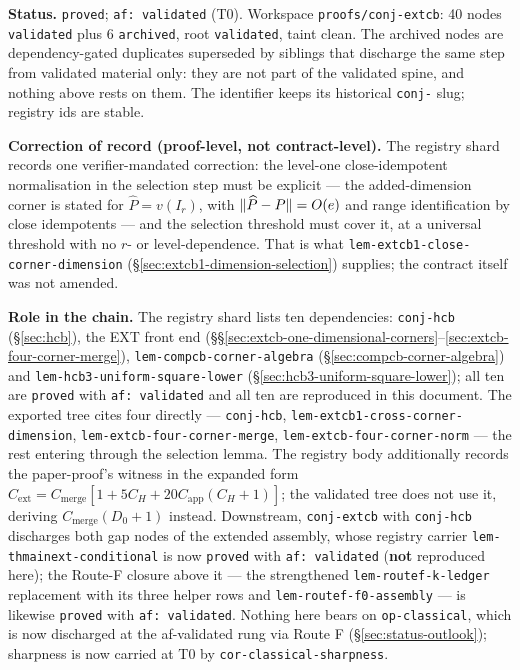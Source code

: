 \medskip
\noindent\textbf{Status.} \texttt{proved}; \texttt{af: validated} (T0). Workspace
\texttt{proofs/conj-extcb}: 40 nodes \texttt{validated} plus 6 \texttt{archived}, root
\texttt{validated}, taint clean. The archived nodes are dependency-gated duplicates
superseded by siblings that discharge the same step from validated material only: they are
not part of the validated spine, and nothing above rests on them. The identifier keeps its
historical \texttt{conj-} slug; registry ids are stable.

\noindent\textbf{Correction of record (proof-level, not contract-level).} The registry
shard records one verifier-mandated correction: the level-one close-idempotent
normalisation in the selection step must be explicit --- the added-dimension corner is
stated for $\widehat P=v(I_r)$, with $\lVert \widehat P-P\rVert=O(e)$ and range identification
by close idempotents --- and the selection threshold must cover it, at a universal
threshold with no $r$- or level-dependence. That is what
\texttt{lem-extcb1-close-corner-dimension} (\S\ref{sec:extcb1-dimension-selection})
supplies; the contract itself was not amended.

\noindent\textbf{Role in the chain.} The registry shard lists ten dependencies:
\texttt{conj-hcb} (\S\ref{sec:hcb}), the EXT front end
(\S\S\ref{sec:extcb-one-dimensional-corners}--\ref{sec:extcb-four-corner-merge}),
\texttt{lem-compcb-corner-algebra} (\S\ref{sec:compcb-corner-algebra}) and
\texttt{lem-hcb3-uniform-square-lower} (\S\ref{sec:hcb3-uniform-square-lower}); all ten are
\texttt{proved} with \texttt{af: validated} and all ten are reproduced in this document.
The exported tree cites four directly --- \texttt{conj-hcb},
\texttt{lem-extcb1-cross-corner-dimension}, \texttt{lem-extcb-four-corner-merge},
\texttt{lem-extcb-four-corner-norm} --- the rest entering through the selection lemma. The
registry body additionally records the paper-proof's witness in the expanded form
$C_{\mathrm{ext}}=C_{\mathrm{merge}}[1+5C_H+20C_{\mathrm{app}}(C_H+1)]$; the validated tree
does not use it, deriving $C_{\mathrm{merge}}(D_0+1)$ instead. Downstream, \texttt{conj-extcb}
with \texttt{conj-hcb} discharges both gap nodes of the extended assembly, whose registry
carrier \texttt{lem-thmainext-conditional} is now \texttt{proved} with
\texttt{af: validated} (\textbf{not} reproduced here); the Route-F closure above it — the
strengthened \texttt{lem-routef-k-ledger} replacement with its three helper rows and
\texttt{lem-routef-f0-assembly} — is likewise \texttt{proved} with \texttt{af: validated}.
Nothing here bears on \texttt{op-classical}, which is now discharged at the af-validated rung via Route F (\S\ref{sec:status-outlook}); sharpness is now carried at T0 by \texttt{cor-classical-sharpness}.
